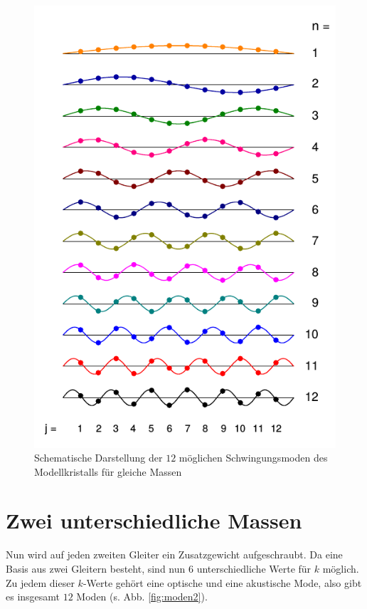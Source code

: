 \begin{figure}[tb]
  \centering
  \includegraphics[scale=1.0]{./fig/moden1.png}
  \caption{Schematische Darstellung der $12$ möglichen Schwingungsmoden des Modellkristalls für gleiche Massen \cite{Litmap}}
  \label{fig:moden1}
\end{figure}

\section{Zwei unterschiedliche Massen}

Nun wird auf jeden zweiten Gleiter ein Zusatzgewicht aufgeschraubt. Da eine Basis aus zwei Gleitern besteht, sind nun $6$ unterschiedliche Werte für $k$ möglich. Zu jedem dieser $k$-Werte gehört eine optische und eine akustische Mode, also gibt es insgesamt $12$ Moden (s. Abb. \ref{fig:moden2}).

